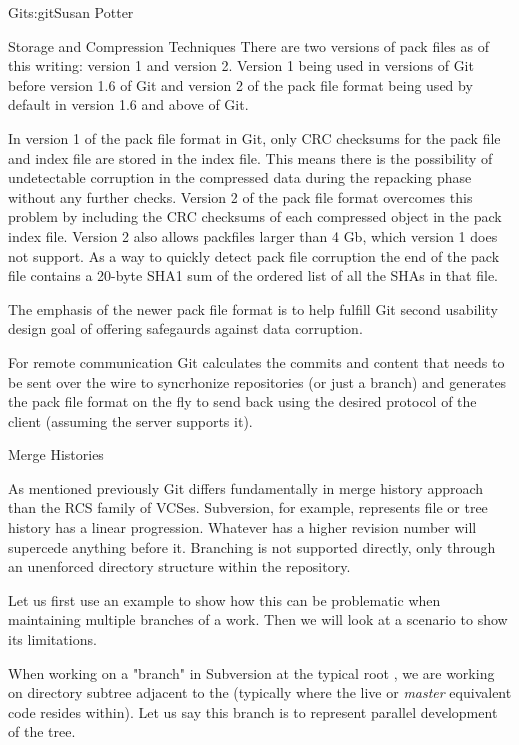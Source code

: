 \begin{aosachapter}{Git}{s:git}{Susan Potter}
\begin{aosasect1}{Storage and Compression Techniques}
There are two versions of pack files as of this writing: version 1 and
version 2. Version 1 being used in versions of Git before version 1.6 of Git
and version 2 of the pack file format being used by default in version 1.6
and above of Git.

In version 1 of the pack file format in Git, only CRC checksums for
the pack file and index file are stored in the index file. This means there
is the possibility of undetectable corruption in the compressed data during
the repacking phase without any further checks. Version 2 of the pack file
format overcomes this problem by including the CRC checksums of each
compressed object in the pack index file. Version 2 also allows packfiles
larger than 4 Gb, which version 1 does not support. As a way to quickly
detect pack file corruption the end of the pack file contains a 20-byte SHA1
sum of the ordered list of all the SHAs in that file.

The emphasis of the newer pack file format is to help fulfill Git second
usability design goal of offering safegaurds against data corruption.

For remote communication Git calculates the commits and content that needs
to be sent over the wire to syncrhonize repositories (or just a branch) and
generates the pack file format on the fly to send back using the desired
protocol of the client (assuming the server supports it).

\end{aosasect1}

\begin{aosasect1}{Merge Histories}

As mentioned previously Git differs fundamentally in merge history approach
than the RCS family of VCSes. Subversion, for example, represents
file or tree history has a linear progression. Whatever has a higher revision
number will supercede anything before it. Branching is not supported directly,
only through an unenforced directory structure within the repository.

Let us first use an example to show how this can be problematic when
maintaining multiple branches of a work. Then we will look at a scenario to
show its limitations.

When working on a "branch" in Subversion at the typical root
, we are working on directory subtree adjacent to
the  (typically where the live or \emph{master} equivalent code
resides within). Let us say this branch is to represent parallel development
of the  tree.


\end{aosasect1}
\end{aosachapter}
